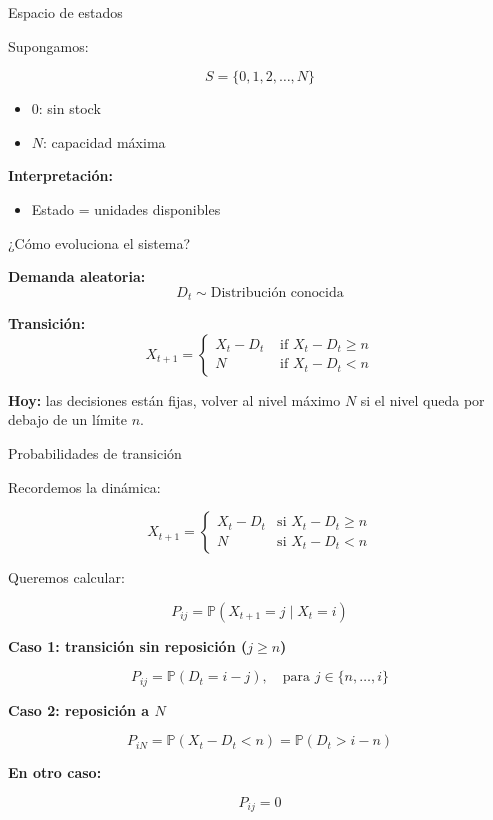\documentclass{beamer}
\begin{document}
\begin{frame}{Espacio de estados}

Supongamos:

\[
S = \{0,1,2,\dots,N\}
\]

\pause

\begin{itemize}
\item \(0\): sin stock
\item \(N\): capacidad máxima
\end{itemize}

\pause

\textbf{Interpretación:}
\begin{itemize}
\item Estado = unidades disponibles
\end{itemize}

\end{frame}

\begin{frame}{¿Cómo evoluciona el sistema?}

\textbf{Demanda aleatoria:}
\[
D_t \sim \text{Distribución conocida}
\]

\pause

\textbf{Transición:}
\[
X_{t+1} = 
\begin{cases} 
X_t - D_t & \text{ if } X_t - D_t \geq n  \\
N & \text{ if } X_t - D_t < n 
\end{cases}
\]

\pause

\textbf{Hoy:} las decisiones est\'an fijas, volver al nivel m\'aximo $N$ si el nivel queda por debajo de un l\'imite $n$.

\end{frame}
\begin{frame}{Probabilidades de transición}

Recordemos la dinámica:

\[
X_{t+1} = 
\begin{cases} 
X_t - D_t & \text{si } X_t - D_t \geq n \\[4pt]
N & \text{si } X_t - D_t < n 
\end{cases}
\]

\pause

Queremos calcular:

\[
P_{ij} = \mathbb{P}(X_{t+1} = j \mid X_t = i)
\]

\pause

\textbf{Caso 1: transición sin reposición (\(j \geq n\))}

\[
P_{ij} = \mathbb{P}(D_t = i - j), \quad \text{para } j \in \{n, \dots, i\}
\]

\pause

\textbf{Caso 2: reposición a \(N\)}

\[
P_{iN} = \mathbb{P}(X_t - D_t < n)
= \mathbb{P}(D_t > i - n)
\]

\pause

\textbf{En otro caso:}

\[
P_{ij} = 0
\]

\end{frame}
\end{document}
